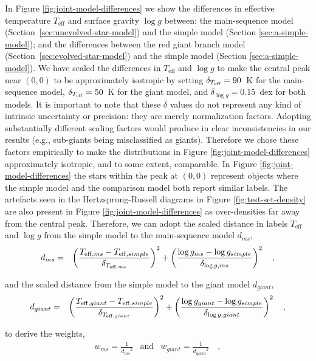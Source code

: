 \documentclass[preprint]{aastex}
\newcommand{\teff}{T_{\mathrm{eff}}}
\newcommand{\logg}{\log g}
\begin{document}
In Figure \ref{fig:joint-model-differences} we show the differences in effective 
temperature $\teff$ and surface gravity $\logg$ between: the main-sequence model 
(Section~\ref{sec:unevolved-star-model}) and the simple model (Section 
\ref{sec:a-simple-model}); and the differences between the red giant branch model 
(Section~\ref{sec:evolved-star-model}) and the simple model (Section 
\ref{sec:a-simple-model}).  We have scaled the differences in $\teff$ and $\logg$ 
to make the central peak near $(0, 0)$ to be approximately isotropic by setting
	$\delta_{T_{\rm eff}} = 90$~K for the main-sequence model, 
	$\delta_{T_{\rm eff}} = 50$~K for the giant model, and 
	$\delta_{\log{g}} = 0.15$~dex for both models.
It is important to note that these $\delta$ values do not represent any kind of 
intrinsic uncertainty or precision: they are merely normalization factors.  Adopting
substantially different scaling factors would produce in clear inconsistencies in our
results (e.g., sub-giants being misclassified as giants).  Therefore we chose these 
factors empirically to make the distributions in Figure \ref{fig:joint-model-differences}
approximately isotropic, and to some extent, comparable.  In Figure 
\ref{fig:joint-model-differences} the stars within the peak at $(0, 0)$ represent 
objects where the simple model and the comparison model both report similar labels.  
The artefacts seen in the Hertzsprung-Russell diagrams in Figure \ref{fig:test-set-density} 
are also present in Figure \ref{fig:joint-model-differences} as over-densities far away
from the central peak.  Therefore, we can adopt the scaled distance in labels 
$\teff$ and $\logg$ from the simple model to the main-sequence model $d_{ms}$,
\begin{eqnarray}
	d_{ms} & = & \left(\frac{T_{{\rm eff},ms} - T_{{\rm eff},simple}}{\delta_{T_{{\rm eff},ms}}}\right)^2 + \left(\frac{\log{g}_{ms} - \log{g}_{simple}}{\delta_{\log{g},ms}}\right)^2 \quad ,
\end{eqnarray}

\noindent{}and the scaled distance from the simple model to the giant model $d_{giant}$,
\begin{eqnarray}
	d_{giant} & = & \left(\frac{T_{{\rm eff},giant} - T_{{\rm eff},simple}}{\delta_{T_{{\rm eff},giant}}}\right)^2 + \left(\frac{\log{g}_{giant} - \log{g}_{simple}}{\delta_{\log{g},giant}}\right)^2  \quad ,
\label{eq:d_giant}
\end{eqnarray}

\noindent{}to derive the weights,
\begin{eqnarray}
	w_{ms} = \frac{1}{{d_{ms}}^2} & \text{and} & w_{giant} = \frac{1}{{d_{giant}}^2} \quad ,
\end{eqnarray}
\end{document}
